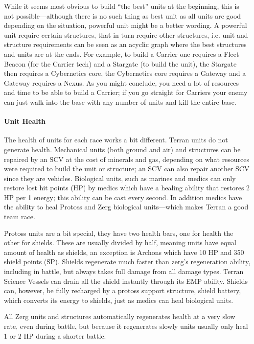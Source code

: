 While it seems most obvious to build “the best” units at the beginning, this is not
possible—although there is no such thing as best unit as all units are good depending on the
situation, powerful unit might be a better wording. A powerful unit require certain structures, that
in turn require other structures, i.e. unit and structure requirements can be seen as an acyclic
graph  where the best structures and units are at the ends. For example, to build a Carrier one
requires a Fleet Beacon (for the Carrier tech) and a Stargate (to build the unit), the Stargate then
requires a Cybernetics core, the Cybernetics core requires a Gateway and a Gateway requires a Nexus.
As you might conclude, you need a lot of resources and time to be able to build a Carrier; if you go
straight for Carriers your enemy can just walk into the base with any number of units and kill the
entire base.

\paragraph{Unit Health}
The health of units for each race works a bit different. Terran units do not generate health.
Mechanical units (both ground and air) and structures can be repaired by an SCV at the cost of
minerals and gas, depending on what resources were required to build the unit or structure; an SCV
can also repair another SCV since they are vehicles. Biological units, such as marines and medics
can only restore lost hit points (HP) by medics which have a healing ability that restores 2 HP per
1 energy; this ability can be cast every second. In addition medics have the ability to heal Protoss
and Zerg biological units—which makes Terran a good team race.

Protoss units are a bit special, they have two health bars, one for health the other for shields.
These are usually divided by half, meaning units have equal amount of health as shields, an
exception is Archons which have 10 HP and 350 shield points (SP). Shields regenerate much faster
than zerg’s regeneration ability, including in battle, but always takes full damage from all damage
types. Terran Science Vessels can drain all the shield instantly through its EMP ability. Shields
can, however, be fully recharged by a protoss support structure, shield battery, which converts its
energy to shields, just as medics can heal biological units.

All Zerg units and structures automatically regenerates health at a very slow rate, even during
battle, but because it regenerates slowly units usually only heal 1 or 2 HP during a shorter battle.

